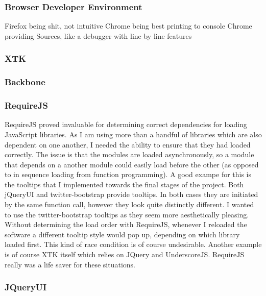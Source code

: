 \documentclass[a4paper,11pt,titlepage]{article}
\begin{document}
\subsubsection{Browser Developer Environment}

Firefox being shit, not intuitive
Chrome being best
printing to console
Chrome providing Sources, like a debugger with line by line features



\subsubsection{XTK}

\subsubsection{Backbone}

\subsubsection{RequireJS}

RequireJS proved invaluable for determining correct dependencies for loading JavaScript libraries.
As I am using more than a handful of libraries which are also dependent on one another, I needed the ability to ensure that they had loaded correctly. The issue is that the modules are loaded asynchronously, so a module that depends on a another module could easily load before the other (as opposed to in sequence loading from function programming). A good exampe for this is the tooltips that I implemented towards the final stages of the project. Both jQueryUI and twitter-bootstrap provide tooltips. In both cases they are initiated by the same function call, however they look quite distinctly different. I wanted to use the twitter-bootstrap tooltips as they seem more aesthetically pleasing. Without determining the load order with RequireJS, whenever I reloaded the software a different tooltip style would pop up, depending on which library loaded first. This kind of race condition is of course undesirable.
Another example is of course XTK itself which relies on JQuery and UnderscoreJS. RequireJS really was a life saver for these situations.






\subsubsection{JQueryUI}
\end{document}
